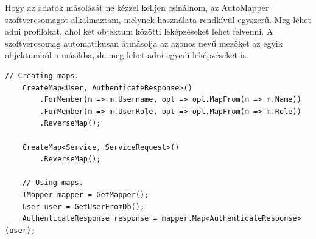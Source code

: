 Hogy az adatok másolását ne kézzel kelljen csinálnom, az AutoMapper\cite{automapper} szoftvercsomagot alkalmaztam, melynek használata rendkívül egyszerű.
Meg lehet adni profilokat, ahol két objektum közötti leképzéseket lehet felvenni. A szoftvercsomag automatikusan átmásolja az azonos nevű mezőket az egyik objektumból a másikba,
de meg lehet adni egyedi leképzéseket is.
\pagebreak
\begin{lstlisting}[style=csharp, caption=Egy példa az AutoMapper használatára.]
    // Creating maps.
    CreateMap<User, AuthenticateResponse>()
        .ForMember(m => m.Username, opt => opt.MapFrom(m => m.Name))
        .ForMember(m => m.UserRole, opt => opt.MapFrom(m => m.Role))
        .ReverseMap();

    CreateMap<Service, ServiceRequest>()
        .ReverseMap();

    // Using maps.
    IMapper mapper = GetMapper();
    User user = GetUserFromDb();
    AuthenticateResponse response = mapper.Map<AuthenticateResponse>(user);
\end{lstlisting}
